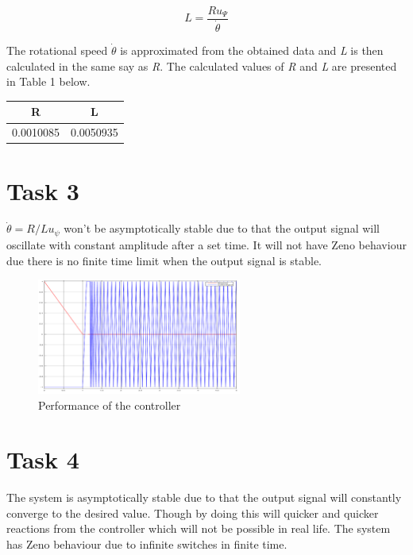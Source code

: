\documentclass[a4paper,12pt,oneside,onecolumn]{article} %
\begin{document}
\begin{equation}
L = \frac{Ru_\Psi}{\dot{\theta}}
\end{equation}

The rotational speed $\dot{\theta}$ is approximated from the obtained data and \emph{L} is then calculated in the same say as \emph{R}. The calculated values of \emph{R} and \emph{L} are presented in Table 1 below. 
\begin{center}
	\begin{tabular}{| c | c |}
	\hline
	R & L \\ \hline
	0.0010085 & 0.0050935 \\ \hline
	
	\end{tabular}
\end{center}

\section*{Task 3}

$\dot{\theta} = R/L u_\psi$ won't be asymptotically stable due to that the output signal will oscillate with constant amplitude after a set time. It will not have Zeno behaviour due there is no finite time limit when the output signal is stable. 

\begin{figure}[H]
\begin{center}	
  \includegraphics[width = 0.6\textwidth]{rot1.png}
  \caption{Performance of the controller}
  
 \end{center}
\end{figure}


\section*{Task 4}

The system is asymptotically stable due to that the output signal will constantly converge to the desired value. Though by doing this will quicker and quicker reactions from the controller which will not be possible in real life. The system has Zeno behaviour due to infinite switches in finite time.
\end{document}
